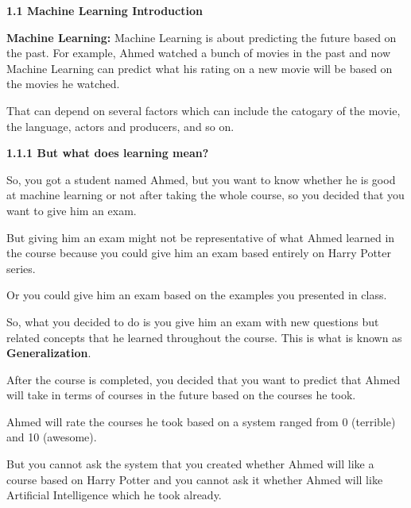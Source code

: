 \documentclass{article}
\begin{document}
\begin{center}
    \Huge \textbf{1.1 Machine Learning Introduction}
    \vspace*{0.7cm}
\end{center}

\large \textbf{Machine Learning: } Machine Learning is about predicting the future based on the past.
For example, Ahmed watched a bunch of movies in the past and now Machine Learning can predict what his rating on a new movie will be based on the movies he watched.

\vspace{0.5cm}

That can depend on several factors which can include the catogary of the movie, the language, actors and producers, and so on.

\vspace{0.5cm}

\Large \textbf{1.1.1 But what does learning mean?}

\vspace{0.7cm}

\large So, you got a student named Ahmed, but you want to know whether he is good at machine learning or not after taking the whole course, so you decided that you want to give him an exam.

\vspace{0.5cm}

\large But giving him an exam might not be representative of what Ahmed learned in the course because you could give him an exam based entirely on Harry Potter series.

Or you could give him an exam based on the examples you presented in class.

\vspace{0.5cm}

\large So, what you decided to do is you give him an exam with new questions but related concepts that he learned throughout the course. This is what is known as \textbf{Generalization}.

\vspace{0.5cm}

\large After the course is completed, you decided that you want to predict that Ahmed will take in terms of courses in the future based on the courses he took.

Ahmed will rate the courses he took based on a system ranged from 0 (terrible) and 10 (awesome). 

But you cannot ask the system that you created whether Ahmed will like a course based on Harry Potter and you cannot ask it whether Ahmed will like Artificial Intelligence which he took already.
\end{document}
